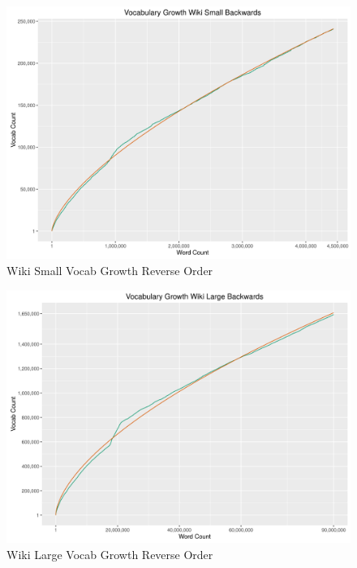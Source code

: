 \documentclass[11pt]{article}
\begin{document}
\begin{figure}[h]
\includegraphics[width=\columnwidth]{code/wikiSmallVGB.png}
\caption{Wiki Small Vocab Growth Reverse Order}
\label{fig:wsvgb}
\end{figure}
\begin{figure}[h]
\includegraphics[width=\columnwidth]{code/wikiLargeVGB.png}
\caption{Wiki Large Vocab Growth Reverse Order}
\label{fig:wlvgb}
\end{figure}
\end{document}
